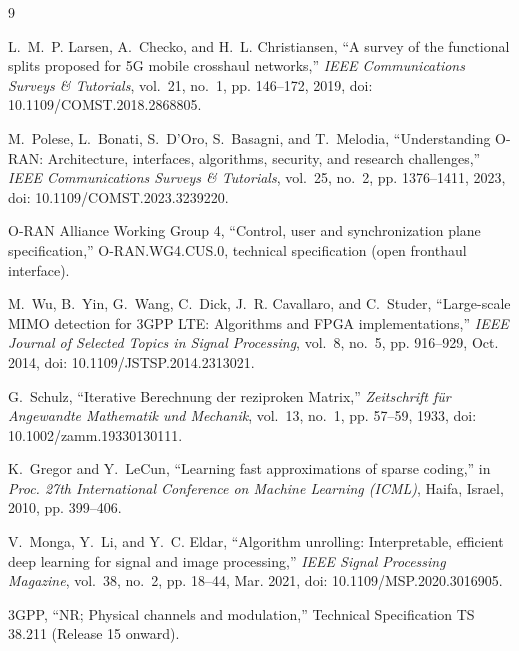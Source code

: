\documentclass[11pt,a4paper]{article}
\begin{document}
\begin{thebibliography}{9}
\setlength{\itemsep}{1pt}\small

L.~M.~P. Larsen, A.~Checko, and H.~L. Christiansen, ``A survey of the
functional splits proposed for 5G mobile crosshaul networks,'' \emph{IEEE
Communications Surveys \& Tutorials}, vol.~21, no.~1, pp. 146--172, 2019,
doi: 10.1109/COMST.2018.2868805.

M.~Polese, L.~Bonati, S.~D'Oro, S.~Basagni, and T.~Melodia, ``Understanding
O-RAN: Architecture, interfaces, algorithms, security, and research
challenges,'' \emph{IEEE Communications Surveys \& Tutorials}, vol.~25,
no.~2, pp. 1376--1411, 2023, doi: 10.1109/COMST.2023.3239220.

O-RAN Alliance Working Group 4, ``Control, user and synchronization plane
specification,'' O-RAN.WG4.CUS.0, technical specification (open fronthaul
interface).

M.~Wu, B.~Yin, G.~Wang, C.~Dick, J.~R. Cavallaro, and C.~Studer,
``Large-scale MIMO detection for 3GPP LTE: Algorithms and FPGA
implementations,'' \emph{IEEE Journal of Selected Topics in Signal
Processing}, vol.~8, no.~5, pp. 916--929, Oct. 2014, doi:
10.1109/JSTSP.2014.2313021.

G.~Schulz, ``Iterative Berechnung der reziproken Matrix,'' \emph{Zeitschrift
f\"ur Angewandte Mathematik und Mechanik}, vol.~13, no.~1, pp. 57--59, 1933,
doi: 10.1002/zamm.19330130111.

K.~Gregor and Y.~LeCun, ``Learning fast approximations of sparse coding,'' in
\emph{Proc. 27th International Conference on Machine Learning (ICML)}, Haifa,
Israel, 2010, pp. 399--406.

V.~Monga, Y.~Li, and Y.~C. Eldar, ``Algorithm unrolling: Interpretable,
efficient deep learning for signal and image processing,'' \emph{IEEE Signal
Processing Magazine}, vol.~38, no.~2, pp. 18--44, Mar. 2021, doi:
10.1109/MSP.2020.3016905.

3GPP, ``NR; Physical channels and modulation,'' Technical Specification TS
38.211 (Release 15 onward).

\end{thebibliography}
\end{document}
